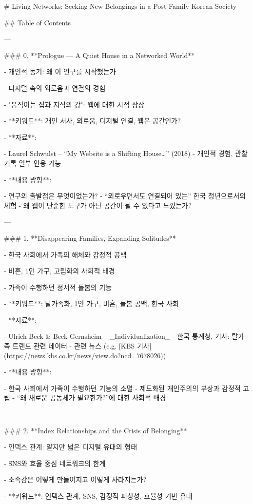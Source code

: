 # Living Networks: Seeking New Belongings in a Post-Family Korean Society

## Table of Contents

---

### 0. **Prologue — A Quiet House in a Networked World**

- 개인적 동기: 왜 이 연구를 시작했는가

- 디지털 속의 외로움과 연결의 경험

- "움직이는 집과 지식의 강": 웹에 대한 시적 상상

- **키워드**: 개인 서사, 외로움, 디지털 연결, 웹은 공간인가?

- **자료**:

  - Laurel Schwulst – “My Website is a Shifting House…” (2018)
  - 개인적 경험, 관찰 기록 일부 인용 가능

- **내용 방향**:

  - 연구의 출발점은 무엇이었는가?
  - “외로우면서도 연결되어 있는” 한국 청년으로서의 체험
  - 왜 웹이 단순한 도구가 아닌 공간이 될 수 있다고 느꼈는가?

---

### 1. **Disappearing Families, Expanding Solitudes**

- 한국 사회에서 가족의 해체와 감정적 공백

- 비혼, 1인 가구, 고립화의 사회적 배경

- 가족이 수행하던 정서적 돌봄의 기능

- **키워드**: 탈가족화, 1인 가구, 비혼, 돌봄 공백, 한국 사회

- **자료**:

  - Ulrich Beck & Beck-Gernsheim – _Individualization_
  - 한국 통계청, 기사: 탈가족 트렌드 관련 데이터
  - 관련 뉴스 (e.g. [KBS 기사](https://news.kbs.co.kr/news/view.do?ncd=7678026))

- **내용 방향**:

  - 한국 사회에서 가족이 수행하던 기능의 소멸
  - 제도화된 개인주의의 부상과 감정적 고립
  - “왜 새로운 공동체가 필요한가?”에 대한 사회적 배경

---

### 2. **Index Relationships and the Crisis of Belonging**

- 인덱스 관계: 얕지만 넓은 디지털 유대의 형태

- SNS와 효율 중심 네트워크의 한계

- 소속감은 어떻게 만들어지고 어떻게 사라지는가?

- **키워드**: 인덱스 관계, SNS, 감정적 피상성, 효율성 기반 유대

